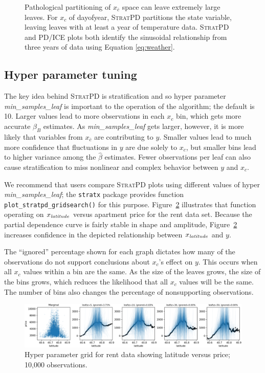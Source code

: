 \documentclass[12pt]{article}
\newcommand{\figref}[1]{Figure~\ref{#1}}
\newcommand{\spd}{\fontfamily{cmr}\textsc{\small StratPD}}
\newcommand{\xnc}{$x_{\overline{c}}$}
\begin{document}
\begin{figure}[htbp]
\begin{center}
\caption{Pathological partitioning of \xnc{} space can leave extremely large leaves. For $x_c$ of dayofyear, \spd{} partitions the state variable, leaving leaves with at least a year of temperature data. \spd{} and PD/ICE plots both identify the sinusoidal relationship from three years of data using Equation \eqref{eq:weather}.}
\label{fig:dayofyear_vs_temp}
\end{center}
\end{figure}

\subsection{Hyper parameter tuning}

The key idea behind \spd{} is stratification and so hyper parameter {\it min\_samples\_leaf} is  important to the operation of the algorithm; the default is 10. Larger values lead to more observations in each $x_c$ bin, which gets more accurate $\hat{\beta}_B$ estimates. As {\it min\_samples\_leaf} gets larger, however, it is more likely that variables from \xnc{} are contributing to $y$.  Smaller values lead to much more confidence that fluctuations in $y$ are due solely to $x_c$, but smaller bins lead to higher variance among the $\hat{\beta}$ estimates. Fewer observations per leaf can also cause stratification to miss nonlinear and complex behavior between $y$ and $x_c$.

We recommend that users compare \spd{} plots using different values of hyper {\it min\_samples\_leaf}; the {\tt stratx} package provides function {\tt plot\_stratpd\_gridsearch()} for this purpose. \figref{fig:latitude_grid} illustrates that function operating on $x_{\it latitude}$ versus apartment price for the rent data set. Because the partial dependence curve is fairly stable in shape and amplitude, \figref{fig:latitude_grid} increases confidence in the depicted relationship between $x_{\it latitude}$ and $y$.

The ``ignored'' percentage shown for each graph dictates how many of the observations do not support conclusions about $x_c$'s effect on $y$. This occurs when all $x_c$ values within a bin are the same. As the size of the leaves grows, the size of the bins grows, which reduces the likelihood that all $x_c$ values will be the same.  The number of bins also changes the percentage of nonsupporting observations.

\begin{figure}[htbp]
\begin{center}
\includegraphics[scale=0.5]{images/latitude_meta.png}
\caption{Hyper parameter grid for rent data showing latitude versus price; 10,000 observations.}
\label{fig:latitude_grid}
\end{center}
\end{figure}
\end{document}
